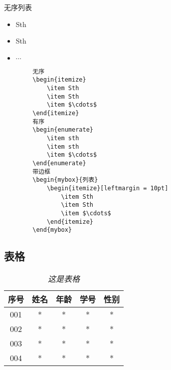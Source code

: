 \documentclass[a4paper, 12pt, UTF8]{ctexart}
\begin{document}
\bigskip


\medskip

\begin{mybox}{无序列表}
    \begin{itemize}[leftmargin = 10pt]
        \item Sth
        \item Sth
        \item $\cdots$
    \end{itemize}
\end{mybox}

\begin{listing}[ht]
    \begin{verbatim}
        无序
        \begin{itemize}
            \item Sth
            \item Sth
            \item $\cdots$
        \end{itemize}
        有序
        \begin{enumerate}
            \item sth
            \item sth
            \item $\cdots$
        \end{enumerate}
        带边框
        \begin{mybox}{列表}
            \begin{itemize}[leftmargin = 10pt]
                \item Sth
                \item Sth
                \item $\cdots$
            \end{itemize}
        \end{mybox}
    \end{verbatim}
    \caption{\em mybox}
    \label{mybox}
\end{listing}

\clearpage
\subsection{表格}
\begin{table}[ht]
    \centering
    \caption{\em 这是表格}
    \vskip 0.1in
    \label{table}
    \begin{tabular}{c|cccc}
      \hline
      \hline
      \rule{0pt}{3ex}
      序号 & 姓名 & 年龄 & 学号 & 性别 
                                  \rule[-1.2ex]{0pt}{0pt} \\\hline
      001 & *  &  *  & *  & * \\ 
      002 & *  &  *  & *  & * \\
      003 & *  &  *  & *  & * \\      
      004 & *  &  *  & *  & * \\
      \hline
      \hline 
    \end{tabular}
\end{table}
\end{document}
